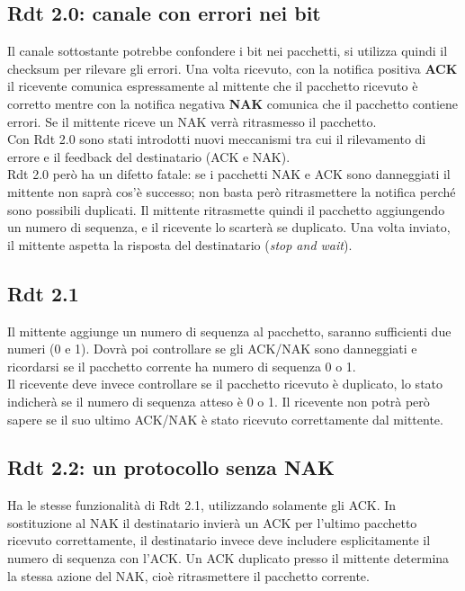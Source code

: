 \documentclass{report}
\begin{document}
	\subsection{Rdt 2.0: canale con errori nei bit}
	Il canale sottostante potrebbe confondere i bit nei pacchetti, si utilizza quindi il checksum per rilevare gli errori. Una volta ricevuto, con la notifica positiva \textbf{ACK} il ricevente comunica espressamente al mittente che il pacchetto ricevuto è corretto mentre con la notifica negativa \textbf{NAK} comunica che il pacchetto contiene errori. Se il mittente riceve un NAK verrà ritrasmesso il pacchetto.
	\medskip\\Con Rdt 2.0 sono stati introdotti nuovi meccanismi tra cui il rilevamento di errore e il feedback del destinatario (ACK e NAK).
	\medskip\\ Rdt 2.0 però ha un difetto fatale: se i pacchetti NAK e ACK sono danneggiati il mittente non saprà cos'è successo; non basta però ritrasmettere la notifica perché sono possibili duplicati.
	Il mittente ritrasmette quindi il pacchetto aggiungendo un numero di sequenza, e il ricevente lo scarterà se duplicato. Una volta inviato, il mittente aspetta la risposta del destinatario (\textit{stop and wait}).
	\subsection{Rdt 2.1}
	Il mittente aggiunge un numero di sequenza al pacchetto, saranno sufficienti due numeri (0 e 1). Dovrà poi controllare se gli ACK/NAK sono danneggiati e ricordarsi se il pacchetto corrente ha numero di sequenza 0 o 1.
	\medskip\\Il ricevente deve invece controllare se il pacchetto ricevuto è duplicato, lo stato indicherà se il numero di sequenza atteso è 0 o 1. Il ricevente non potrà però sapere se il suo ultimo ACK/NAK è stato ricevuto correttamente dal mittente.
	\subsection{Rdt 2.2: un protocollo senza NAK}
	Ha le stesse funzionalità di Rdt 2.1, utilizzando solamente gli ACK. In sostituzione al NAK il destinatario invierà un ACK per l'ultimo pacchetto ricevuto correttamente, il destinatario invece deve includere esplicitamente il numero di sequenza con l'ACK. Un ACK duplicato presso il mittente determina la stessa azione del NAK, cioè ritrasmettere il pacchetto corrente.
\end{document}
